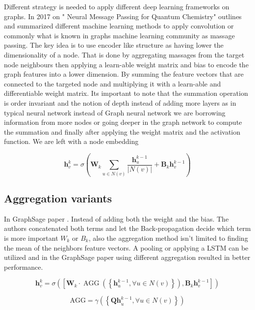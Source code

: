 \documentclass[10pt,twocolumn,letterpaper]{article}
\begin{document}
Different strategy is needed to apply different deep learning frameworks on graphs. In 2017 on " Neural Message Passing for Quantum Chemistry" \cite{Gilmer2017} outlines and summarized different machine learning methods to apply convolution or commonly what is known in graphs machine learning community as massage passing. The key idea is to use encoder like structure as having lower the dimensionality of a node. That is done by aggregating massages from the target node neighbours then applying a learn-able weight matrix and bias to encode the graph features into a lower dimension. By summing the feature vectors that are connected to the targeted node and multiplying it with a learn-able and differentiable weight matrix. Its important to note that the summation operation is order invariant and the notion of depth instead of adding more layers as in typical neural network instead of Graph neural network we are borrowing information from more nodes or going deeper in the graph network to compute the summation and finally after applying the weight matrix and the activation function. We are left with a node embedding 


\begin{equation}
\mathbf{h}_{v}^{k}=\sigma\left(\mathbf{W}_{k} \sum_{u \in N(v)} \frac{\mathbf{h}_{u}^{k-1}}{|N(v)|}+\mathbf{B}_{k} \mathbf{h}_{v}^{k-1}\right)
\end{equation}

 

\subsection{Aggregation variants}

In GraphSage paper \cite{Hamilton2017}. Instead of adding both the weight and the bias. The authors concatenated both terms and let the Back-propagation decide which term is more important ${W}_{k}$ or ${B}_{k}$, also the aggregation method isn't limited to finding the mean of the neighbors feature vectors. A pooling or applying a LSTM can be utilized and in the GraphSage paper using different aggregation resulted in better performance.  


\begin{equation}
\mathbf{h}_{v}^{k}=\sigma\left(\left[\mathbf{W}_{k} \cdot \operatorname{AGG}\left(\left\{\mathbf{h}_{u}^{k-1}, \forall u \in N(v)\right\}\right), \mathbf{B}_{k} \mathbf{h}_{v}^{k-1}\right]\right)
\end{equation}

\begin{equation}
\mathrm{AGG}=\gamma\left(\left\{\mathbf{Q h}_{u}^{k-1}, \forall u \in N(v)\right\}\right)
\end{equation}
\end{document}
